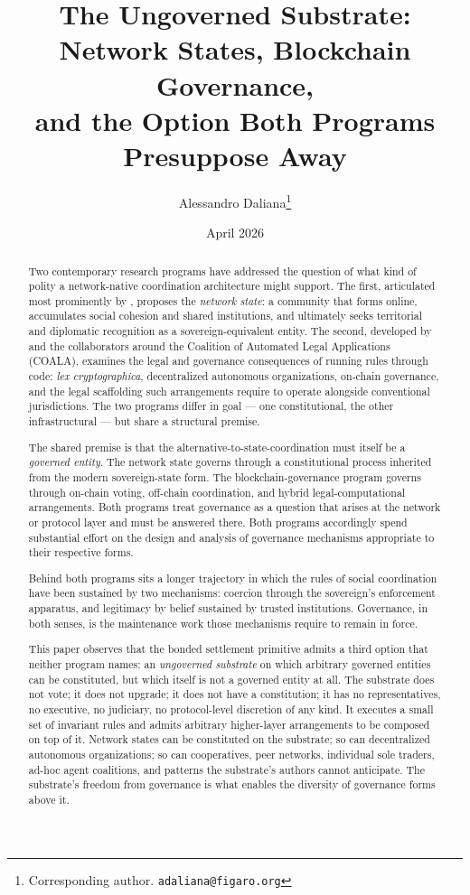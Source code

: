 \documentclass[11pt,a4paper]{article}
\title{%
  The Ungoverned Substrate:\\
  Network States, Blockchain Governance,\\
  and the Option Both Programs Presuppose Away%
}
\author{
  Alessandro Daliana\thanks{Corresponding author. \texttt{adaliana@figaro.org}}
}
\date{April 2026}
\theoremstyle{remark}
\begin{document}
\maketitle

\begin{abstract}
Two contemporary research programs have addressed the question of
what kind of polity a network-native coordination architecture
might support. The first, articulated most prominently by
\citet{srinivasan2022network}, proposes the \emph{network state}:
a community that forms online, accumulates social cohesion and
shared institutions, and ultimately seeks territorial and
diplomatic recognition as a sovereign-equivalent entity. The
second, developed by \citet{defilippi_wright_2018} and the
collaborators around the Coalition of Automated Legal
Applications (COALA), examines the legal and governance
consequences of running rules through code: \emph{lex
cryptographica}, decentralized autonomous organizations,
on-chain governance, and the legal scaffolding such arrangements
require to operate alongside conventional jurisdictions. The two
programs differ in goal --- one constitutional, the other
infrastructural --- but share a structural premise.

The shared premise is that the alternative-to-state-coordination
must itself be a \emph{governed entity}. The network state
governs through a constitutional process inherited from the
modern sovereign-state form. The blockchain-governance program
governs through on-chain voting, off-chain coordination, and
hybrid legal-computational arrangements. Both programs treat
governance as a question that arises at the network or protocol
layer and must be answered there. Both programs accordingly
spend substantial effort on the design and analysis of governance
mechanisms appropriate to their respective forms.

Behind both programs sits a longer trajectory in which the rules
of social coordination have been sustained by two mechanisms:
coercion through the sovereign's enforcement apparatus, and
legitimacy by belief sustained by trusted institutions.
Governance, in both senses, is the maintenance work those
mechanisms require to remain in force.

This paper observes that the bonded settlement primitive admits
a third option that neither program names: an \emph{ungoverned
substrate} on which arbitrary
governed entities can be constituted, but which itself is not a
governed entity at all. The substrate does not vote; it does not
upgrade; it does not have a constitution; it has no
representatives, no executive, no judiciary, no protocol-level
discretion of any kind. It executes a small set of invariant
rules and admits arbitrary higher-layer arrangements to be
composed on top of it. Network states can be constituted on the
substrate; so can decentralized autonomous organizations; so
can cooperatives, peer networks, individual sole traders,
ad-hoc agent coalitions, and patterns the substrate's authors
cannot anticipate. The substrate's freedom from governance is
what enables the diversity of governance forms above it.


\end{abstract}
\end{document}
